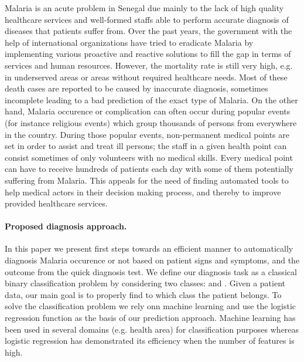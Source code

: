 Malaria is an acute problem in Senegal  due mainly to the lack of high quality healthcare services and well-formed
staffs able to perform accurate diagnosis of diseases that patients suffer from. Over the past years, the government with 
the help of international organizations have tried to eradicate Malaria by implementing various proactive and reactive solutions 
to fill the gap in terms of services and human resources. However, the mortality rate is still very high, e.g. in underserved areas
or areas without required healthcare needs. Most of these death cases are reported to be caused by inaccurate diagnosis, sometimes 
incomplete leading to a bad prediction of the exact type of Malaria.
On the other hand, Malaria occurence or complication can often occur  during  popular events (for instance religious events)
which group thousands of persons from everywhere in the country. During those popular events, non-permanent medical points are set in order
to assist and treat ill persons; the staff in a given health point can consist sometimes of only volunteers with no medical skills. Every medical 
point can have to receive hundreds of patients each day with some of them potentially suffering from Malaria. 
This appeals for the need of finding automated tools to help medical actors in their decision making process, and thereby to improve provided 
healthcare services.   

\paragraph*{Proposed diagnosis approach.}
In this paper we present first steps towards an efficient manner to automatically diagnosis Malaria occurence or not based on patient signs and symptoms,
and the outcome from the quick diagnosis test. We define our diagnosis task as a classical binary classification problem by considering two classes:  and .
Given a patient data, our main goal is to properly find to which class the patient belongs. To solve the classification problem we rely onn machine learning  and use the logistic regression
function as the basis of our prediction approach. Machine learning has been used in several domains (e.g. health area) for classification purposes whereas logistic regression has demonstrated its efficiency when the number of features is high. 
 
